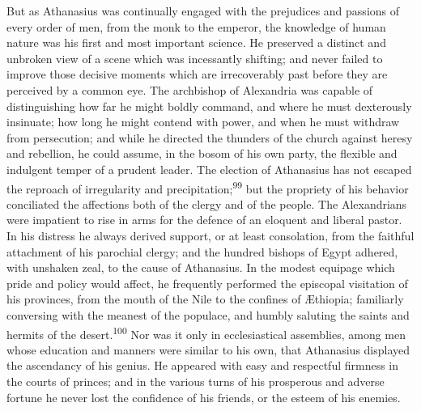 But as Athanasius was continually engaged with the prejudices and
passions of every order of men, from the monk to the emperor, the
knowledge of human nature was his first and most important
science. He preserved a distinct and unbroken view of a scene
which was incessantly shifting; and never failed to improve those
decisive moments which are irrecoverably past before they are
perceived by a common eye. The archbishop of Alexandria was
capable of distinguishing how far he might boldly command, and
where he must dexterously insinuate; how long he might contend
with power, and when he must withdraw from persecution; and while
he directed the thunders of the church against heresy and
rebellion, he could assume, in the bosom of his own party, the
flexible and indulgent temper of a prudent leader. The election
of Athanasius has not escaped the reproach of irregularity and
precipitation;\textsuperscript{99} but the propriety of his behavior conciliated
the affections both of the clergy and of the people. The
Alexandrians were impatient to rise in arms for the defence of an
eloquent and liberal pastor. In his distress he always derived
support, or at least consolation, from the faithful attachment of
his parochial clergy; and the hundred bishops of Egypt adhered,
with unshaken zeal, to the cause of Athanasius. In the modest
equipage which pride and policy would affect, he frequently
performed the episcopal visitation of his provinces, from the
mouth of the Nile to the confines of Æthiopia; familiarly
conversing with the meanest of the populace, and humbly saluting
the saints and hermits of the desert.\textsuperscript{100} Nor was it only in
ecclesiastical assemblies, among men whose education and manners
were similar to his own, that Athanasius displayed the ascendancy
of his genius. He appeared with easy and respectful firmness in
the courts of princes; and in the various turns of his prosperous
and adverse fortune he never lost the confidence of his friends,
or the esteem of his enemies.



